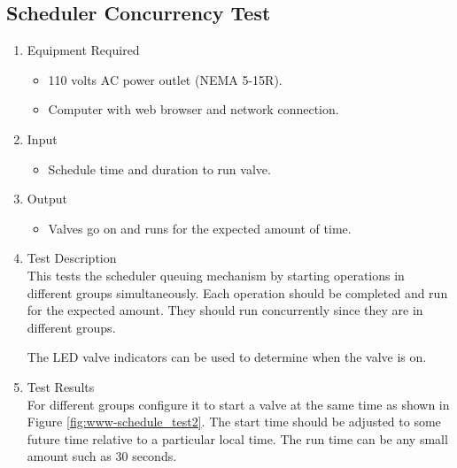 \documentclass{article}
\begin{document}

\clearpage
\subsection{Scheduler Concurrency Test}

\begin{enumerate}
\item Equipment Required
	\begin{itemize}
	\item 110 volts AC power outlet (NEMA 5-15R).
	\item Computer with web browser and network connection.
	\end{itemize}
\item Input
	\begin{itemize}
	\item Schedule time and duration to run valve.
	\end{itemize}
\item Output
	\begin{itemize}
	\item Valves go on and runs for the expected amount of time.
	\end{itemize}

\item Test Description \\

This tests the scheduler queuing mechanism by starting
operations in different groups simultaneously.
Each operation should be completed and run for the expected amount.
They should run concurrently since they are in different groups.

The LED valve indicators can be used to determine when the valve is on.

\pagebreak
\item Test Results \\
	\vspace{1em}
	For different groups configure it to start a valve 
	at the same time as shown in Figure \ref{fig:www-schedule_test2}.
	The start time should be adjusted to some future time relative
	to a particular local time.
	The run time can be any small amount such as 30 seconds. \\


\end{enumerate}
\end{document}
